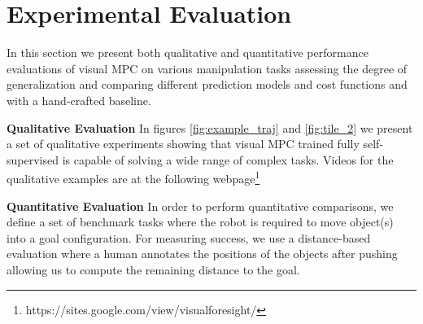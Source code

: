 \section{Experimental Evaluation}
\label{sec:experiments}
In this section we present both qualitative and quantitative  performance evaluations of visual MPC on various manipulation tasks assessing the degree of generalization and comparing different prediction models and cost functions and with a hand-crafted baseline.

\noindent \textbf{Qualitative Evaluation}
In figures \ref{fig:example_traj} and \ref{fig:tile_2} we present a set of qualitative experiments showing that visual MPC trained fully self-supervised is capable of solving a wide range of complex tasks.
Videos for the qualitative examples are at the following webpage\footnote{https://sites.google.com/view/visualforesight/}

\noindent \textbf{Quantitative Evaluation} In order to perform quantitative comparisons, we define a set of benchmark tasks where the robot is required to move object(s) into a goal configuration. For measuring success, we use a distance-based evaluation where a human annotates the positions of the objects after pushing allowing us to compute the remaining distance to the goal.


